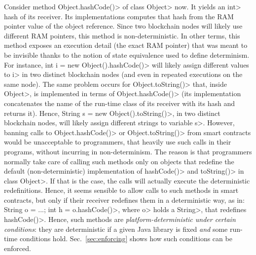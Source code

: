 Consider method \<Object.hashCode()> of class \<Object> now. It yields an \<int>
hash of its receiver. Its implementations computes that hash from the
RAM pointer value of the object reference.
Since two blockchain nodes will likely use different RAM pointers,
this method is non-deterministic.
In other terms, this method exposes an execution detail (the exact RAM pointer)
that was meant to be invisible thanks to the notion of state equivalence used
to define determinism.
For instance,
\<int i = new Object().hashCode()>
will likely assign different values to \<i>
in two distinct blockchain nodes
(and even in repeated executions on the same node).
The same problem occurs for \<Object.toString()> that, inside
\<Object>, is implemented in terms of \<Object.hashCode()> (its
implementation concatenates
the name of the run-time class of its receiver with its hash and returns it).
Hence, \<String s = new Object().toString()>,
in two distinct blockchain nodes,
will likely assign different strings to variable \<s>.
However, banning calls to \<Object.hashCode()> or \<Object.toString()>
from smart contracts would be unacceptable to programmers, that
heavily use such calls in their programs, without incurring in
non-determinism. The reason is that programmers normally
take care of calling such methods only on objects that redefine
the default (non-deterministic) implementation of
\<hashCode()> and \<toString()> in class \<Object>.
If that is the case, the calls will actually
execute the deterministic redefinitions. Hence, it seems sensible
to allow calls to such methods in smart contracts, but only if their receiver
redefines them in a deterministic way, as in:
\<String o = ...; int h = o.hashCode()>,
where \<o> holds a \<String>, that redefines \<hashCode()>.
%
%
%
Hence, such methods are \emph{platform-deterministic under certain conditions}:
they are deterministic if a given Java library is fixed \emph{and} some run-time conditions hold.
Sec.~\ref{sec:enforcing} shows how such conditions can be enforced.

